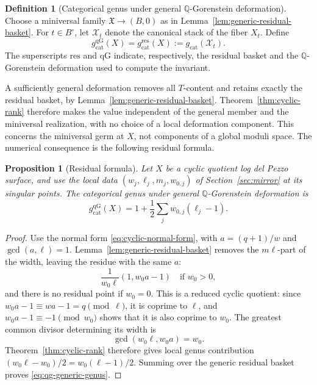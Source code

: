 \documentclass[11pt]{article}
\theoremstyle{plain}
\newtheorem{proposition}[theorem]{Proposition}
\theoremstyle{definition}
\newtheorem{definition}[theorem]{Definition}
\theoremstyle{remark}
\newcommand{\Q}{\mathbb Q}
\newcommand{\1}{\mathbf 1}
\begin{document}
\begin{definition}[Categorical genus under general $\Q$-Gorenstein deformation]\label{def:qg-generic-genus}
Choose a miniversal family $\mathfrak X\to(B,0)$ as in Lemma~\ref{lem:generic-residual-basket}.  For $t\in B^\circ$, let $\mathcal X_t$ denote the canonical stack of the fiber $X_t$.  Define
\[
g_{\mathrm{cat}}^{\mathrm{qG}}(X)
=g_{\mathrm{cat}}^{\mathrm{res}}(X)
:=g_{\mathrm{cat}}(\mathcal X_t).
\]
The superscripts $\mathrm{res}$ and $\mathrm{qG}$ indicate, respectively, the residual basket and the $\Q$-Gorenstein deformation used to compute the invariant.
\end{definition}

A sufficiently general deformation removes all $T$-content and retains exactly the residual basket, by Lemma~\ref{lem:generic-residual-basket}.  Theorem~\ref{thm:cyclic-rank} therefore makes the value independent of the general member and the miniversal realization, with no choice of a local deformation component.  This concerns the miniversal germ at $X$, not components of a global moduli space.  The numerical consequence is the following residual formula.

\begin{proposition}[Residual formula]\label{prop:qg-residual-genus}
Let $X$ be a cyclic quotient log del Pezzo surface, and use the local data $(w_j,\ell_j,m_j,w_{0,j})$ of Section~\ref{sec:mirror} at its singular points.  The categorical genus under general $\Q$-Gorenstein deformation is
\begin{equation}\label{eq:qg-generic-genus}
\boxed{g_{\mathrm{cat}}^{\mathrm{qG}}(X)
=1+\frac12\sum_j w_{0,j}(\ell_j-1).}
\end{equation}
\end{proposition}

\begin{proof}
Use the normal form \eqref{eq:cyclic-normal-form}, with $a=(q+1)/w$ and $\gcd(a,\ell)=1$.  Lemma~\ref{lem:generic-residual-basket} removes the $m\ell$-part of the width, leaving the residue with the same $a$:
\[
\frac1{w_0\ell}(1,w_0a-1)
\quad\text{if }w_0>0,
\]
and there is no residual point if $w_0=0$.  This is a reduced cyclic quotient: since $w_0a-1\equiv wa-1=q\pmod\ell$, it is coprime to $\ell$, and $w_0a-1\equiv-1\pmod{w_0}$ shows that it is also coprime to $w_0$.  The greatest common divisor determining its width is
\[
\gcd(w_0\ell,w_0a)=w_0.
\]
Theorem~\ref{thm:cyclic-rank} therefore gives local genus contribution
$(w_0\ell-w_0)/2=w_0(\ell-1)/2$.  Summing over the generic residual basket proves \eqref{eq:qg-generic-genus}.
\end{proof}
\end{document}
